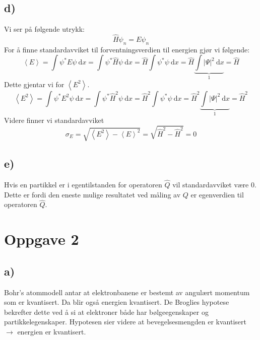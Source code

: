 \documentclass[norsk]{article}
\begin{document}
\subsection*{d)}
Vi ser på følgende utrykk: 
\begin{equation}
\hat{H}ψ_n = E ψ_n
\end{equation}
For å finne standardavviket til forventningsverdien til energien gjør vi følgende: 
\begin{equation}
\left<E\right> = ∫ ψ^{*}E ψ \ \mathrm{d}x = ∫ ψ^{*} \hat{H} ψ \ \mathrm{d}x = \hat{H} ∫ ψ^{*} ψ \ \mathrm{d}x = \hat{H} \underbrace{∫ \left|Ψ\right|^2 \ \mathrm{d}x}_{1} = \hat{H}
\end{equation}
Dette gjentar vi for $\left<E^2\right>$. 
\begin{equation}\label{eq: <E^2>}
\left<E^2\right> = ∫  ψ^{*}E^2 ψ \ \mathrm{d}x = ∫ ψ^{*} \hat{H}^2 ψ \ \mathrm{d}x = \hat{H}^2 ∫ ψ^{*} ψ \ \mathrm{d}x = \hat{H}^2 \underbrace{∫ \left|Ψ\right|^2 \ \mathrm{d}x}_{1} = \hat{H}^2
\end{equation}
Videre finner vi standardavviket 
\begin{equation}
σ_E = \sqrt{\left<E^2\right> - \left<E\right>^2} = \sqrt{\hat{H}^2 - \hat{H}^2} = 0
\end{equation}

\subsection*{e)}
Hvis en partikkel er i egentilstanden for operatoren $\hat{Q}$ vil standardavviket være 0. Dette er fordi den eneste mulige resultatet ved måling av $Q$ er egenverdien til operatoren $\hat{Q}$. 

\section*{Oppgave 2}
\subsection*{a)}
Bohr's atommodell antar at elektronbanene er bestemt av angulært momentum som er kvantisert. Da blir også energien kvantisert. De Broglies hypotese bekrefter dette ved å si at elektroner både har bølgeegenskaper og partikkelegenskaper. Hypotesen sier videre at bevegelsesmengden er kvantisert $→$ energien er kvantisert.
\end{document}
